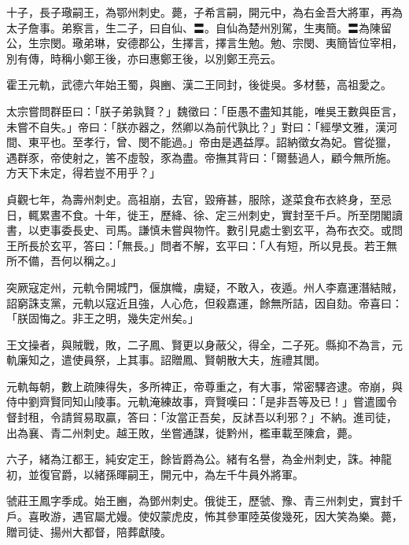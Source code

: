\begin{pinyinscope}
 十子，長子璥嗣王，為鄂州刺史。薨，子希言嗣，開元中，為右金吾大將軍，再為太子詹事。弟察言，生二子，曰自仙、〓。自仙為楚州別駕，生夷簡。〓為陳留公，生宗閔。璥弟琳，安德郡公，生擇言，擇言生勉。勉、宗閔、夷簡皆位宰相，別有傳，時稱小鄭王後，亦曰惠鄭王後，以別鄭王亮云。



 霍王元軌，武德六年始王蜀，與豳、漢二王同封，後徙吳。多材藝，高祖愛之。



 太宗嘗問群臣曰：「朕子弟孰賢？」魏徵曰：「臣愚不盡知其能，唯吳王數與臣言，未嘗不自失。」帝曰：「朕亦器之，然卿以為前代孰比？」對曰：「經學文雅，漢河間、東平也。至孝行，曾、閔不能過。」帝由是遇益厚。詔納徵女為妃。嘗從獵，遇群豕，帝使射之，筈不虛彀，豕為盡。帝撫其背曰：「爾藝過人，顧今無所施。方天下未定，得若豈不用乎？」



 貞觀七年，為壽州刺史。高祖崩，去官，毀瘠甚，服除，遂菜食布衣終身，至忌日，輒累晝不食。十年，徙王，歷絳、徐、定三州刺史，實封至千戶。所至閉閣讀書，以吏事委長史、司馬。謙慎未嘗與物忤。數引見處士劉玄平，為布衣交。或問王所長於玄平，答曰：「無長。」問者不解，玄平曰：「人有短，所以見長。若王無所不備，吾何以稱之。」



 突厥寇定州，元軌令開城門，偃旗幟，虜疑，不敢入，夜遁。州人李嘉運潛結賊，詔窮誅支黨，元軌以寇近且強，人心危，但殺嘉運，餘無所詰，因自劾。帝喜曰：「朕固悔之。非王之明，幾失定州矣。」



 王文操者，與賊戰，敗，二子鳳、賢更以身蔽父，得全，二子死。縣抑不為言，元軌廉知之，遣使員祭，上其事。詔贈鳳、賢朝散大夫，旌禮其閭。



 元軌每朝，數上疏陳得失，多所裨正，帝尊重之，有大事，常密驛咨逮。帝崩，與侍中劉齊賢同知山陵事。元軌淹練故事，齊賢嘆曰：「是非吾等及已！」嘗遣國令督封租，令請貿易取贏，答曰：「汝當正吾矣，反訹吾以利邪？」不納。進司徒，出為襄、青二州刺史。越王敗，坐嘗通謀，徙黔州，檻車載至陳倉，薨。



 六子，緒為江都王，純安定王，餘皆爵為公。緒有名譽，為金州刺史，誅。神龍初，並復官爵，以緒孫暉嗣王，開元中，為左千牛員外將軍。



 虢莊王鳳字季成。始王豳，為鄧州刺史。俄徙王，歷虢、豫、青三州刺史，實封千戶。喜畋游，遇官屬尤嫚。使奴蒙虎皮，怖其參軍陸英俊幾死，因大笑為樂。薨，贈司徒、揚州大都督，陪葬獻陵。




\end{pinyinscope}
